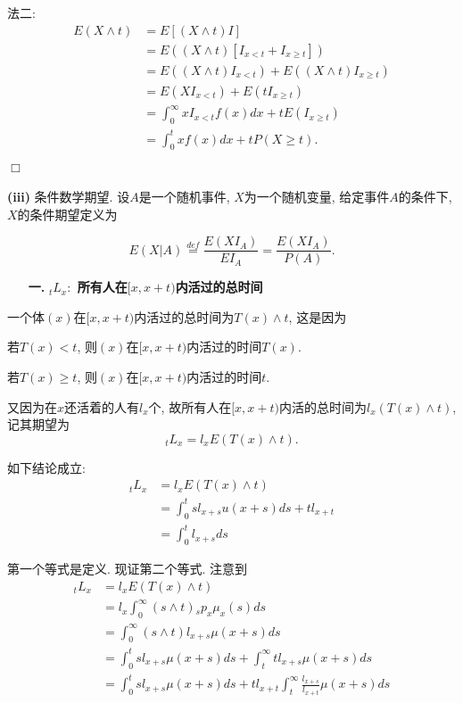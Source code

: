 \documentclass[a4paper,10pt]{ctexbook}
\newcommand{\hei}{\CJKfamily{hei}}      %
\def\qed{\hfill$\Box$\medskip}
\begin{document}
法二:
\begin{align*}
    E(X\wedge t) & =E[(X\wedge t)I]                                \\
                 & =E((X\wedge t)[I_{x<t}+I_{x\ge t}])             \\
                 & =E((X\wedge t)I_{x<t})+E((X\wedge t)I_{x\ge t}) \\
                 & =E(XI_{x<t})+E(tI_{x\ge t})                     \\
                 & =\int_0^{\infty}xI_{x<t}f(x)dx+tE(I_{x\ge t})   \\
                 & =\int_0^t xf(x)dx+tP(X\ge t).                   \\
\end{align*}
\qed

{\rm\bf(iii)} 条件数学期望. 设$A$是一个随机事件, $X$为一个随机变量, 给定事件$A$的条件下, $X$的条件期望定义为

$$E(X|A)\overset{def}{=}\frac{E(XI_A)}{EI_A}=\frac{E(XI_A)}{P(A)}.$$


\begin{itemize}
    \item[{\bf\hei 一.}]{\bf\hei ${}_tL_x:$ 所有人在$[x,x+t)$内活过的总时间}
\end{itemize}


一个体$(x)$在$[x,x+t)$内活过的总时间为$T(x)\wedge t$, 这是因为

若$T(x)<t$, 则$(x)$在$[x,x+t)$内活过的时间$T(x).$

若$T(x)\ge t$, 则$(x)$在$[x,x+t)$内活过的时间$t.$

又因为在$x$还活着的人有$l_x$个, 故所有人在$[x,x+t)$内活的总时间为$l_x(T(x)\wedge t)$, 记其期望为$$ {}_tL_x=l_xE(T(x)\wedge t).$$

\begin{proposition} 如下结论成立:
    \begin{align*}
        {}_tL_x & =l_xE(T(x)\wedge t)                 \\
                & =\int_0^t sl_{x+s}u(x+s)ds+tl_{x+t} \\
                & =\int_0^tl_{x+s}ds
    \end{align*}
\end{proposition}
\proof 第一个等式是定义. 现证第二个等式. 注意到
\begin{align*}
    {}_tL_x & =l_xE(T(x)\wedge t)                                                                  \\
            & =l_x\int_0^{\infty} (s\wedge t){}_sp_x\mu_x(s)ds                                     \\
            & =\int_0^{\infty}(s\wedge t)l_{x+s}\mu(x+s)ds                                         \\
            & =\int_0^tsl_{x+s}\mu(x+s)ds+\int_t^{\infty}tl_{x+s}\mu(x+s)ds                        \\
            & =\int_0^tsl_{x+s}\mu(x+s)ds+tl_{x+t}\int_t^{\infty}\frac{l_{x+s}}{l_{x+t}}\mu(x+s)ds
\end{align*}
\end{document}
